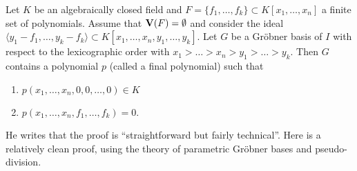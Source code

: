 \begin{theorem}
  Let $K$ be an algebraically closed field and $F = \{f_{1}, \dots, f_{k}\} \subset K[x_{1}, \dots, x_{n}]$ a finite set of polynomials. Assume that $\operatorname{\mathbf V}(F) = \emptyset$ and consider the ideal $\langle y_{1} - f_{1}, \dots, y_{k} - f_{k} \rangle \subset K[x_{1}, \dots, x_{n}, y_{1}, \dots, y_{k}]$. Let $G$ be a Gröbner basis of $I$ with respect to the lexicographic order with $x_{1} > \dots > x_{n} > y_{1} > \dots > y_{k}$. Then $G$ contains a polynomial $p$ (called a final polynomial) such that
  \begin{enumerate}
    \item $p(x_{1}, \dots, x_{n}, 0, 0, \dots, 0) \in K$
    \item $p(x_{1}, \dots, x_{n}, f_{1}, \dots, f_{k}) = 0$.
  \end{enumerate}
\end{theorem}

He writes that the proof is ``straightforward but fairly technical''. Here is a relatively clean proof, using the theory of parametric Gröbner bases and pseudo-division.


